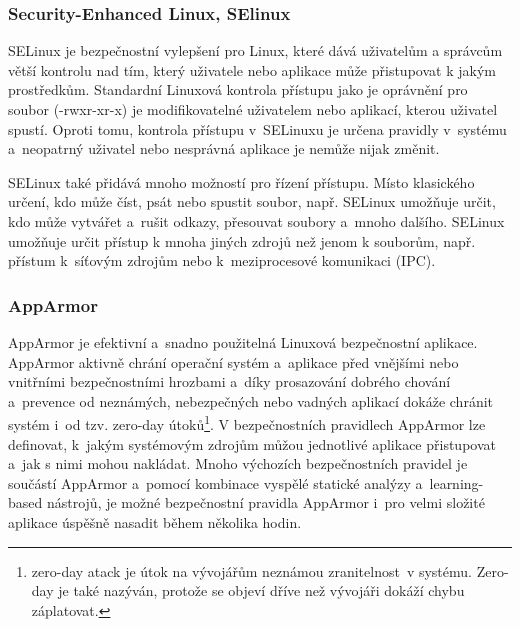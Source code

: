 \documentclass[a4paper,12pt]{article}
\begin{document}
\subsubsection{Security-Enhanced Linux, SElinux}

SELinux je bezpečnostní vylepšení pro Linux, které dává uživatelům a správcům větší kontrolu nad tím, který uživatele nebo aplikace může přistupovat k jakým prostředkům. Standardní Linuxová kontrola přístupu jako je oprávnění pro soubor (-rwxr-xr-x) je modifikovatelné uživatelem nebo aplikací, kterou uživatel spustí. Oproti tomu, kontrola přístupu v~SELinuxu je určena pravidly v~systému a~neopatrný uživatel nebo nesprávná aplikace je nemůže nijak změnit.

SELinux také přidává mnoho možností pro řízení přístupu. Místo klasického určení, kdo může číst, psát nebo spustit soubor, např. SELinux umožňuje určit, kdo může vytvářet a~rušit odkazy, přesouvat soubory a~mnoho dalšího. SELinux umožňuje určit přístup k mnoha jiných zdrojů než jenom k souborům, např. přístum k~síťovým zdrojům nebo k~meziprocesové komunikaci (IPC).\cite{SElinuxWiki}


\subsubsection{AppArmor}
AppArmor je efektivní a~snadno použitelná Linuxová bezpečnostní aplikace. AppArmor aktivně chrání operační systém a~aplikace před vnějšími nebo vnitřními bezpečnostními hrozbami a~díky prosazování dobrého chování a~prevence od neznámých, nebezpečných nebo vadných aplikací dokáže chránit systém i~od tzv. zero-day útoků\footnote{zero-day atack je útok na vývojářům neznámou zranitelnost~v systému. Zero-day je také nazýván, protože se objeví dříve než vývojáři dokáží chybu záplatovat.}. V bezpečnostních pravidlech AppArmor lze definovat, k~jakým systémovým zdrojům můžou jednotlivé aplikace přistupovat a~jak s nimi mohou nakládat. Mnoho výchozích bezpečnostních pravidel je součástí AppArmor a~pomocí kombinace vyspělé statické analýzy a~learning-based nástrojů, je možné bezpečnostní pravidla AppArmor i~pro velmi složité aplikace úspěšně nasadit během několika hodin.\cite{AppArmorWikiMain}
\end{document}
